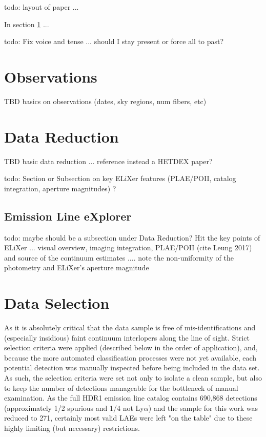 \documentclass{aastex62}
\begin{document}
{ \color{red} todo: layout of paper ...}

In section \ref{sec:obs} ...


{ \color{red} todo: Fix voice and tense ... should I stay present or force all to past?}

\section{Observations} \label{sec:obs}

TBD basics on observations (dates, sky regions, num fibers, etc)

\section{Data Reduction} \label{sec:reduction}

TBD basic data reduction ... reference instead a HETDEX paper?

{ \color{red} todo: Section or Subsection on key ELiXer features (PLAE/POII, catalog integration, aperture magnitudes) ?}

\subsection{Emission Line eXplorer} \label{sec:elixer}
{ \color{red} todo: maybe should be a subsection under Data Reduction? Hit the key points of ELiXer ... visual overview, imaging integration, PLAE/POII (cite Leung 2017) and source of the continuum estimates .... note the non-uniformity of the photometry and ELiXer's aperture magnitude }


\section{Data Selection} \label{sec:selection}

As it is absolutely critical that the data sample is free of mis-identifications and (especially insidious) faint continuum interlopers along the line of sight. Strict selection criteria were applied (described below in the order of application), and, because the more automated classification processes were not yet available, each potential detection was manually inspected before being included in the data set. As such, the selection criteria were set not only to isolate a clean sample, but also to keep the number of detections manageable for the bottleneck of manual examination. As the full HDR1 emission line catalog contains 690,868 detections (approximately 1/2 spurious and 1/4 not Ly$\alpha$) and the sample for this work was reduced to 271, certainly most valid LAEs were left "on the table" due to these highly limiting (but necessary) restrictions. 
\end{document}
